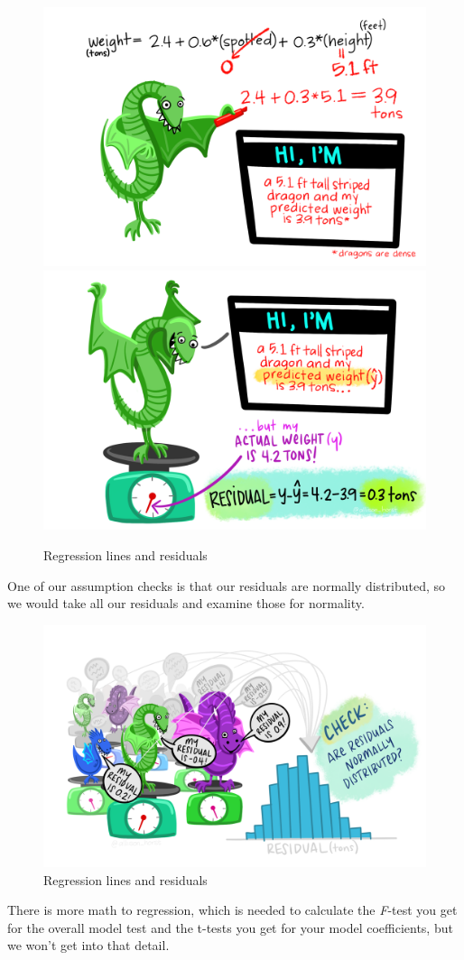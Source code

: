 \documentclass[
]{book}
\begin{document}
\begin{figure}

{\centering \includegraphics[width=0.49\linewidth]{images/13-regression/dragon_predict_mlr} \includegraphics[width=0.49\linewidth]{images/13-regression/dragon_residual} 

}

\caption{Regression lines and residuals}\label{fig:unnamed-chunk-3}
\end{figure}

One of our assumption checks is that our residuals are normally distributed, so we would take all our residuals and examine those for normality.

\begin{figure}

{\centering \includegraphics[width=0.49\linewidth]{images/13-regression/dragon_residual_distribution} 

}

\caption{Regression lines and residuals}\label{fig:unnamed-chunk-4}
\end{figure}

There is more math to regression, which is needed to calculate the \emph{F}-test you get for the overall model test and the t-tests you get for your model coefficients, but we won't get into that detail.
\end{document}
